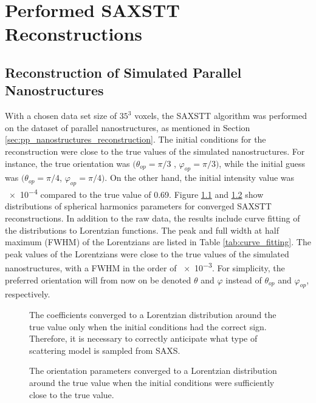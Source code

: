 \chapter{Performed SAXSTT Reconstructions}

\section{Reconstruction of Simulated Parallel Nanostructures}
\label{sec:reconstruction_parallel}

With a chosen data set size of $35^3$ voxels,
the SAXSTT algorithm was performed on the dataset of parallel nanostructures, as mentioned in Section \ref{sec:pp_nanostructures_reconstruction}.
The initial conditions for the reconstruction were close to the true values of the simulated nanostructures.
For instance, the true orientation was $(\theta_{op} = \pi/3$ , $\varphi_{op} = \pi/3)$, while the initial guess was $(\theta_{op} = \pi/4$, $\varphi_{op} = \pi/4)$.
On the other hand, the initial intensity value was \num{e-4} compared to the true value of 0.69.
Figure \ref{fig:coefficient_comparison_AD_SYM} and \ref{fig:orientation_comparison_AD_SYM} show distributions of spherical harmonics parameters for converged SAXSTT reconstructions.
In addition to the raw data, the results include curve fitting of the distributions to Lorentzian functions.
The peak and full width at half maximum (FWHM) of the Lorentzians are listed in Table \ref{tab:curve_fitting}.
The peak values of the Lorentzians were close to the true values of the simulated nanostructures, with a FWHM in the order of \num{e-3}.
For simplicity, the preferred orientation will from now on be denoted $\theta$ and $\varphi$ instead of $\theta_{op}$ and $\varphi_{op}$, respectively.

\begin{figure}[h!]
    \centering
    
    \caption[Distribution of Reconstructed Coefficients]{ The coefficients converged to a Lorentzian distribution
        around the true value only when the initial conditions had the correct sign.
        Therefore, it is necessary to correctly anticipate what type of scattering model is sampled from SAXS. }
    \label{fig:coefficient_comparison_AD_SYM}
\end{figure}

\begin{figure}[h!]
    \centering
    
    \caption[Distribution of Reconstructed Orientation]{  The orientation parameters converged to a Lorentzian distribution
        around the true value when the initial conditions were sufficiently close to the true value.}
    \label{fig:orientation_comparison_AD_SYM}
\end{figure}



